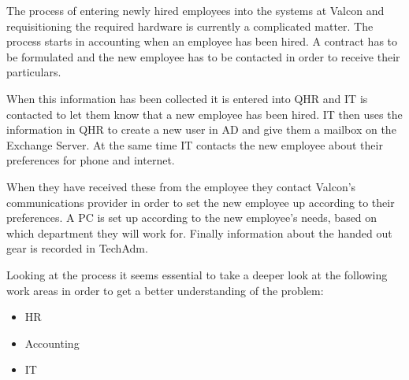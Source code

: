 The process of entering newly hired employees into the systems at Valcon and requisitioning the required hardware is currently a complicated matter.
The process starts in accounting when an employee has been hired.
A contract has to be formulated and the new employee has to be contacted in order to receive their particulars.

When this information has been collected it is entered into QHR and IT is contacted to let them know that a new employee has been hired.
IT then uses the information in QHR to create a new user in AD and give them a mailbox on the Exchange Server.
At the same time IT contacts the new employee about their preferences for phone and internet.

When they have received these from the employee they contact Valcon's communications provider in order to set the new employee up according to their preferences.
A PC is set up according to the new employee's needs, based on which department they will work for.
Finally information about the handed out gear is recorded in TechAdm.

Looking at the process it seems essential to take a deeper look at the following work areas in order to get a better understanding of the problem:
\begin{itemize}
\item HR
\item Accounting
\item IT
\end{itemize}